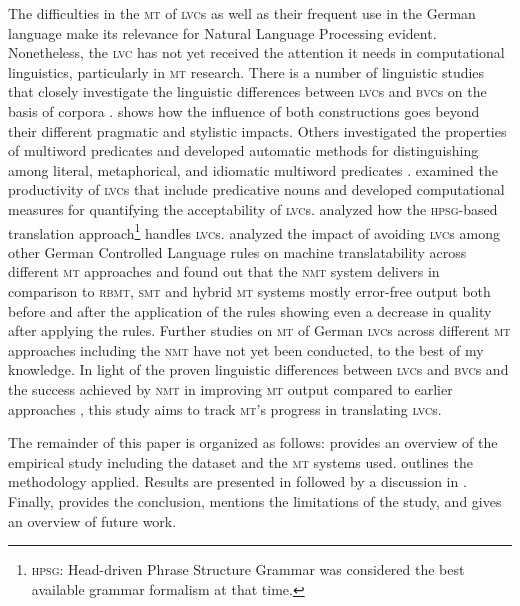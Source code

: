 \documentclass[output=paper]{langsci/langscibook}
\begin{document}
The difficulties in the \textsc{mt} of \textsc{lvc}s as well as their frequent use in the German language make its relevance for Natural Language Processing evident. Nonetheless, the \textsc{lvc} has not yet received the attention it needs in computational linguistics, particularly in \textsc{mt} research. There is a number of linguistic studies that closely investigate the linguistic differences between \textsc{lvc}s and \textsc{bvc}s on the basis of corpora \citep{Glatz2006,Storrer2007,Storrer2006a}. \citet{Storrer2006a} shows how the influence of both constructions goes beyond their different pragmatic and stylistic impacts. Others investigated the properties of multiword predicates and developed automatic methods for distinguishing among literal, metaphorical, and idiomatic multiword predicates \citep*{Fazly2005}. \citet{North2005} examined the productivity of \textsc{lvc}s that include predicative nouns and developed computational measures for quantifying the acceptability of \textsc{lvc}s. \citet{Kuhn1994} analyzed how the \textsc{hpsg}-based translation approach\footnote{\textsc{hpsg}: Head-driven Phrase Structure Grammar \citep{Pollard1994}
was considered the best available grammar formalism at that time.} handles \textsc{lvc}s. \citet{Marzouk2019} analyzed the impact of avoiding \textsc{lvc}s among other German Controlled Language rules on machine translatability across different \textsc{mt} approaches and found out that the \textsc{nmt} system delivers in comparison to \textsc{rbmt}, \textsc{smt} and hybrid \textsc{mt} systems mostly error-free output both before and after the application of the rules showing even a decrease in quality after applying the rules. Further studies on \textsc{mt} of German \textsc{lvc}s across different \textsc{mt} approaches including the \textsc{nmt} have not yet been conducted, to the best of my knowledge. In light of the proven linguistic differences between \textsc{lvc}s and \textsc{bvc}s \citep{Glatz2006,Storrer2007,Storrer2006a} and the success achieved by \textsc{nmt} in improving \textsc{mt} output compared to earlier approaches \citep{Bentivogli2016,Marzouk2019,Popovic2018,Toral2017,}, this study aims to track \textsc{mt}’s progress in translating \textsc{lvc}s.

The remainder of this paper is organized as follows:  provides an overview of the empirical study including the dataset and the \textsc{mt} systems used.  outlines the methodology applied. Results are presented in  followed by a discussion in . Finally,  provides the conclusion, mentions the limitations of the study, and gives an overview of future work.
\end{document}
